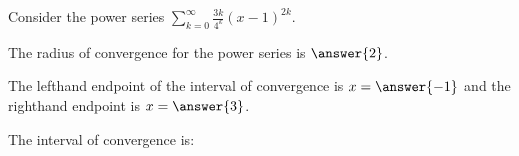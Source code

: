 \documentclass{ximera}
\author{Jim Talamo}
\begin{document}
\begin{exercise}
Consider the power series $\sum_{k=0}^{\infty} \frac{3k}{4^k}(x-1)^{2k}$.

The radius of convergence for the power series is $\answer{2}$.

The lefthand endpoint of the interval of convergence is $x=\answer{-1}$ and the righthand endpoint is $x= \answer{3}$.

\begin{exercise}
The interval of convergence is:
\begin{multipleChoice}
\choice{$(-1,3]$}
\choice{$[-1,3)$}
\choice{$[-1,3]$}
\end{multipleChoice}

\end{exercise}
\end{exercise}
\end{document}
